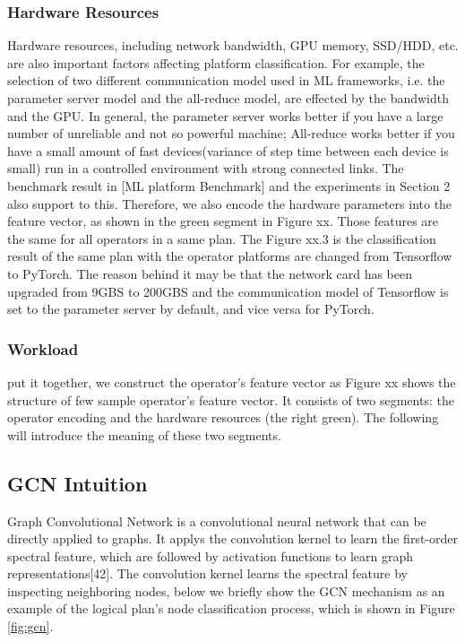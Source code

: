 \subsubsection{Hardware Resources}
Hardware resources, including network bandwidth, GPU memory, SSD/HDD, etc. are also important factors affecting platform classification. 
For example, the selection of two different communication model used in ML frameworks, i.e. the parameter server model and the all-reduce model, are effected by the bandwidth and the GPU. 
In general, the parameter server works better if you have a large number of unreliable and not so powerful machine;
All-reduce works better if you have a small amount of fast devices(variance of step time between each device is small) run in a controlled environment with strong connected links. 
The benchmark result in [ML platform Benchmark] and the experiments in Section 2 also support to this. 
Therefore, we also encode the hardware parameters into the feature vector, as shown in the green segment in Figure xx. 
Those features are the same for all operators in a same plan. 
The Figure xx.3 is the classification result of the same plan with the operator platforms are changed from Tensorflow to PyTorch. 
The reason behind it may be that the network card has been upgraded from 9GBS to 200GBS and the communication model of Tensorflow is set to the parameter server by default, and vice versa for PyTorch. 

\subsubsection{Workload}


put it together, we construct the operator's feature vector as 
Figure xx shows the structure of few sample operator's feature vector. 
It consists of two segments: the operator encoding and the hardware resources (the right green). 
The following will introduce the meaning of these two segments.


\subsection{GCN Intuition}

Graph Convolutional Network is a convolutional neural network that can be directly applied to graphs. 
It applys the convolution kernel to learn the first-order spectral feature, which are followed by activation functions to learn graph representations[42]. 
The convolution kernel learns the spectral feature by inspecting neighboring nodes, below we briefly show the GCN mechanism as an example of the logical plan's node classification process, which is shown in Figure \ref{fig:gcn}.

